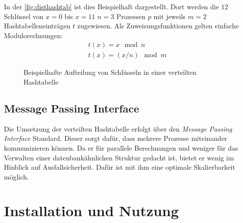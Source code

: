 \documentclass{scrreprt}
\begin{document}
In der \autoref{fig:disthashtab} ist dies Beispielhaft dargestellt. Dort werden die $12$ Schlüssel von $x=0$ bis $x=11$ $n=3$ Prozessen $p$ mit jeweils $m=2$ Hashtabelleneinträgen $t$ zugewiesen. Als Zuweisungsfunktionen gelten einfache Modulorechnungen:
\begin{align*}
t(x)=x\mod n\\
t(x)=(x/n)\mod m
\end{align*}
\begin{figure}[!ht]
\centering
{}
\caption{Beispielhafte Aufteilung von Schlüsseln in einer verteilten Hashtabelle}
\label{fig:disthashtab}
\end{figure}

\section{Message Passing Interface}
Die Umsetzung der verteilten Hashtabelle erfolgt über den \emph{Message Passing Interface} Standard. Dieser sorgt dafür, dass mehrere Prozesse miteinander kommunizieren können. Da er für parallele Berechnungen und weniger für das Verwalten einer datenbankähnlichen Struktur gedacht ist, bietet er wenig im Hinblick auf Ausfallsicherheit. Dafür ist mit ihm eine optimale Skalierbarkeit möglich.

\chapter{Installation und Nutzung}
\end{document}
